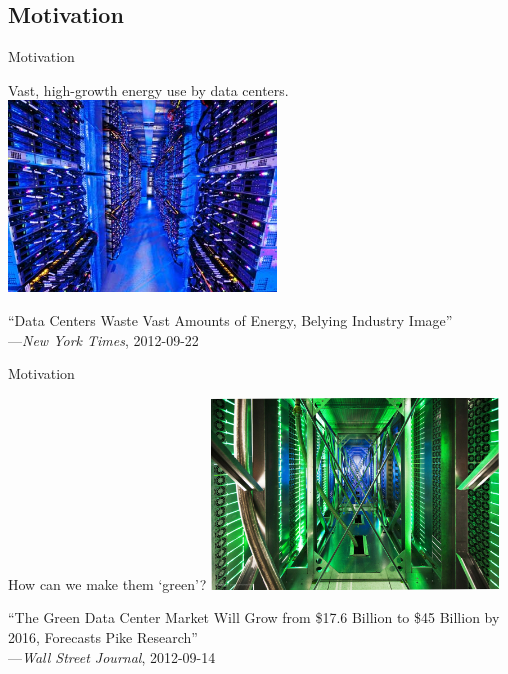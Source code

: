 \documentclass[xcolor=dvipsnames]{beamer}
\begin{document}
\subsection{Motivation}
\begin{frame}{Motivation}
	\begin{block}{Vast, high-growth energy use by data centers.}
		\includegraphics[height=2in]{datacenter.jpg}
	\end{block}
	``Data Centers Waste Vast Amounts of Energy, Belying Industry Image''\\\hspace{2em}---\textit{New York Times}, 2012-09-22
\end{frame}
\begin{frame}{Motivation}
	\begin{block}{How can we make them `green'?}
		\includegraphics[height=2in]{green.jpg}
	\end{block}
	``The Green Data Center Market Will Grow from \$17.6 Billion to \$45 Billion by 2016, Forecasts Pike Research''\\\hspace{2em}---\textit{Wall Street Journal}, 2012-09-14
\end{frame}
\end{document}

